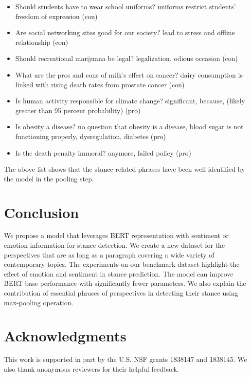 \documentclass[11pt,a4paper]{article}
\begin{document}
 
 \begin{itemize}
     \item  Should students have to wear school uniforms?    uniforms restrict students' freedom of expression (con)
     \item        Are social networking sites good for our society?  lead to stress and offline relationship (con)
     \item        Should recreational marijuana be legal? legalization,  odious occasion (con)
     \item What are the pros and cons of milk's effect on cancer?   dairy consumption is linked with rising death rates from prostate cancer (con)
     \item Is human activity responsible for climate change?  significant, because,  (likely greater than 95 percent probability) (pro)
     \item Is obesity a disease?  no question that obesity is a disease, blood sugar is not functioning properly, dysregulation, diabetes (pro)
     \item Is the death penalty immoral?  anymore, failed policy (pro)

 \end{itemize}

The above list shows that the stance-related phrases have been well identified by the model in the pooling step.   


\section{Conclusion}
We propose a model that leverages BERT representation with sentiment or emotion information for stance detection. We create a new dataset for the perspectives that are as long as a paragraph covering a wide variety of contemporary topics. The experiments on our benchmark dataset highlight the effect of emotion and sentiment in stance prediction. The model can improve BERT base performance with significantly fewer parameters. We also explain the contribution of essential phrases of perspectives in detecting their stance using max-pooling operation.

 \section*{Acknowledgments}
 This  work  is  supported  in  part  by  the U.S. NSF grants 1838147 and 1838145.  We  also  thank  anonymous reviewers for their helpful feedback.
 

\end{document}
